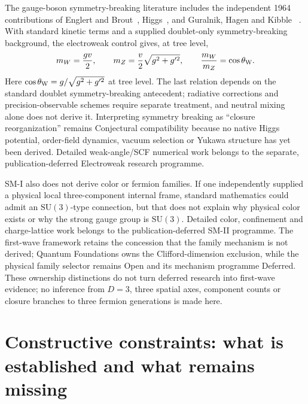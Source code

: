 \documentclass[11pt]{article}
\theoremstyle{definition}
\newcommand{\SUthree}{\mathrm{SU}(3)}
\begin{document}
The gauge-boson symmetry-breaking literature includes the independent
1964 contributions of Englert and Brout~\cite{EnglertBrout1964},
Higgs~\cite{Higgs1964}, and Guralnik, Hagen and Kibble
~\cite{GuralnikHagenKibble1964}.
With standard kinetic terms and a supplied doublet-only symmetry-breaking
background, the electroweak control gives,
at tree level,~\cite{Higgs1964,Weinberg1967}
\begin{equation}
 m_W=\frac{gv}{2},
 \qquad
 m_Z=\frac{v}{2}\sqrt{g^2+g'^2},
 \qquad
 \frac{m_W}{m_Z}=\cos\theta_{\rm W}.
 \label{eq:standard_mass_relation}
\end{equation}
Here $\cos\theta_{\rm W}=g/\sqrt{g^2+g'^2}$ at tree level.
The last relation depends on the standard doublet symmetry-breaking antecedent;
radiative corrections and precision-observable schemes require separate treatment, and neutral mixing alone does not derive it.  Interpreting symmetry breaking as ``closure reorganization'' remains Conjectural compatibility because no native Higgs potential, order-field dynamics, vacuum selection or Yukawa structure has yet been derived.  Detailed weak-angle/SCF numerical work belongs to the separate, publication-deferred Electroweak research programme.

SM-I also does not derive color or fermion families.  If one independently supplied a physical local three-component internal frame, standard mathematics could admit an $\SUthree$-type connection, but that does not explain why physical color exists or why the strong gauge group is $\SUthree$.  Detailed color, confinement and charge-lattice work belongs to the
publication-deferred SM-II programme.  The first-wave framework retains the
concession that the family mechanism is not derived; Quantum Foundations owns
the Clifford-dimension exclusion, while the physical family selector remains
Open and its mechanism programme Deferred.  These ownership distinctions do
not turn deferred research into first-wave evidence; no inference from $D=3$, three spatial axes, component counts or closure branches to three fermion generations is made here.

\section{Constructive constraints: what is established and what remains missing}
\label{sec:constructive_map}
\end{document}
